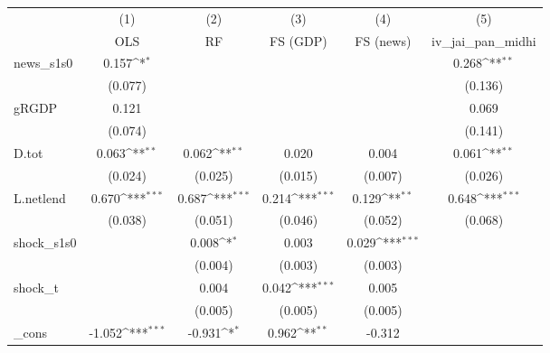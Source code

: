 {
\def\sym#1{\ifmmode^{#1}\else\(^{#1}\)\fi}
\begin{tabular}{l*{5}{c}}
\toprule
            &\multicolumn{1}{c}{(1)}&\multicolumn{1}{c}{(2)}&\multicolumn{1}{c}{(3)}&\multicolumn{1}{c}{(4)}&\multicolumn{1}{c}{(5)}\\
            &\multicolumn{1}{c}{OLS}&\multicolumn{1}{c}{RF}&\multicolumn{1}{c}{FS (GDP)}&\multicolumn{1}{c}{FS (news)}&\multicolumn{1}{c}{iv\_jai\_pan\_midhi}\\
\midrule
news\_s1s0   &       0.157\sym{*}  &                     &                     &                     &       0.268\sym{**} \\
            &     (0.077)         &                     &                     &                     &     (0.136)         \\
\addlinespace
gRGDP       &       0.121         &                     &                     &                     &       0.069         \\
            &     (0.074)         &                     &                     &                     &     (0.141)         \\
\addlinespace
D.tot       &       0.063\sym{**} &       0.062\sym{**} &       0.020         &       0.004         &       0.061\sym{**} \\
            &     (0.024)         &     (0.025)         &     (0.015)         &     (0.007)         &     (0.026)         \\
\addlinespace
L.netlend   &       0.670\sym{***}&       0.687\sym{***}&       0.214\sym{***}&       0.129\sym{**} &       0.648\sym{***}\\
            &     (0.038)         &     (0.051)         &     (0.046)         &     (0.052)         &     (0.068)         \\
\addlinespace
shock\_s1s0  &                     &       0.008\sym{*}  &       0.003         &       0.029\sym{***}&                     \\
            &                     &     (0.004)         &     (0.003)         &     (0.003)         &                     \\
\addlinespace
shock\_t     &                     &       0.004         &       0.042\sym{***}&       0.005         &                     \\
            &                     &     (0.005)         &     (0.005)         &     (0.005)         &                     \\
\addlinespace
\_cons      &      -1.052\sym{***}&      -0.931\sym{*}  &       0.962\sym{**} &      -0.312         &                     \\

\end{tabular}}
